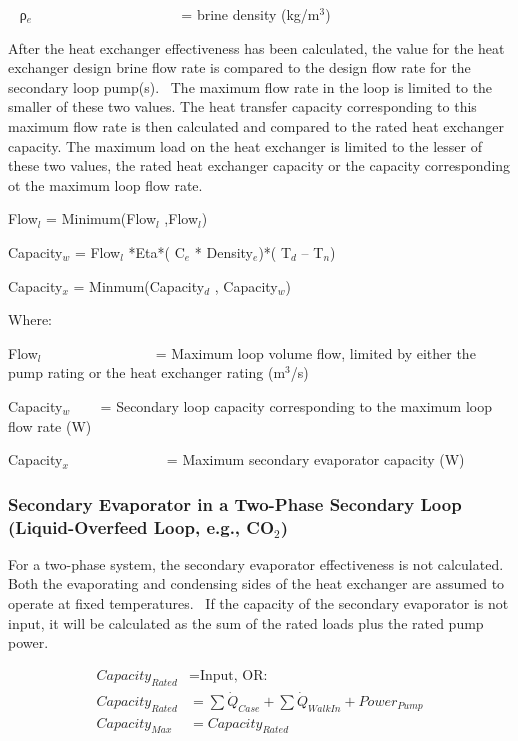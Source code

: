 ~ ρ\(_{e}\)~ ~~~~~~~~~~~~~~~~~~~ = brine density (kg/m\(^{3}\))

After the heat exchanger effectiveness has been calculated, the value for the heat exchanger design brine flow rate is compared to the design flow rate for the secondary loop pump(s).~ The maximum flow rate in the loop is limited to the smaller of these two values. The heat transfer capacity corresponding to this maximum flow rate is then calculated and compared to the rated heat exchanger capacity. The maximum load on the heat exchanger is limited to the lesser of these two values, the rated heat exchanger capacity or the capacity corresponding ot the maximum loop flow rate.

Flow\(_{l}\) = Minimum(Flow\(_{l}\) ,Flow\(_{l}\))

Capacity\(_{w}\) = Flow\(_{l}\) *Eta*( C\(_{e}\) * Density\(_{e}\))*( T\(_{d}\) -- T\(_{n}\))

Capacity\(_{x}\) = Minmum(Capacity\(_{d}\) , Capacity\(_{w}\))

Where:

Flow\(_{l}\)~ ~~~~~~~~~~~~~~ = Maximum loop volume flow, limited by either the pump rating or the heat exchanger rating (m\(^{3}\)/s)

Capacity\(_{w}\) ~~~ = Secondary loop capacity corresponding to the maximum loop flow rate (W)

Capacity\(_{x}\) ~~~~~~~~~~~ ~ = Maximum secondary evaporator capacity (W)

\subsubsection{\texorpdfstring{Secondary Evaporator in a Two-Phase Secondary Loop~ (Liquid-Overfeed Loop, e.g., CO\(_{2}\))}{Secondary Evaporator in a Two-Phase Secondary Loop~ (Liquid-Overfeed Loop, e.g., CO\_\{2\})}}\label{secondary-evaporator-in-a-two-phase-secondary-loop-liquid-overfeed-loop-e.g.-coux5f2}

For a two-phase system, the secondary evaporator effectiveness is not calculated. Both the evaporating and condensing sides of the heat exchanger are assumed to operate at fixed temperatures.~ If the capacity of the secondary evaporator is not input, it will be calculated as the sum of the rated loads plus the rated pump power.

\begin{equation}
  \begin{array}{rl}
    Capacity_{Rated} &= \text{Input,  OR:} \\
    Capacity_{Rated} &= \sum \dot{Q}_{Case} + \sum \dot{Q}_{WalkIn} + Power_{Pump} \\
    Capacity_{Max}   &= Capacity_{Rated}
  \end{array}
\end{equation}

